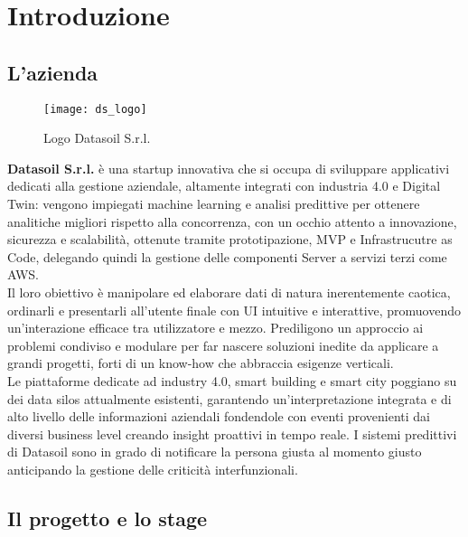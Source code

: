 
\chapter{Introduzione}
\label{cap:introduzione}

\section{L'azienda}
\begin{figure}[ht]
    \centering
    \texttt{[image: ds\_logo]}
    \caption{Logo Datasoil S.r.l.}
\end{figure} 
\aCapo{}
\textbf{Datasoil S.r.l.} è una startup innovativa che si occupa di sviluppare applicativi dedicati alla gestione aziendale, altamente integrati con industria 4.0 e Digital Twin: vengono impiegati machine learning e analisi predittive per ottenere analitiche migliori rispetto alla concorrenza, con un occhio attento a innovazione, sicurezza e scalabilità, ottenute tramite prototipazione, MVP e Infrastrucutre as Code, delegando quindi la gestione delle componenti Server a servizi terzi come AWS.\\
Il loro obiettivo è manipolare ed elaborare dati di natura inerentemente caotica, ordinarli e presentarli all'utente finale con UI intuitive e interattive, promuovendo un'interazione efficace tra utilizzatore e mezzo. Prediligono un approccio ai problemi condiviso e modulare per far nascere soluzioni inedite da applicare a grandi progetti, forti di un know-how che abbraccia esigenze verticali.\\
Le piattaforme dedicate ad industry 4.0, smart building e smart city poggiano su dei data silos attualmente esistenti, garantendo un'interpretazione integrata e di alto livello delle informazioni aziendali fondendole con eventi provenienti dai diversi business level creando insight proattivi in tempo reale. I sistemi predittivi di Datasoil sono in grado di notificare la persona giusta al momento giusto anticipando la gestione delle criticità interfunzionali.

\section{Il progetto e lo stage}

